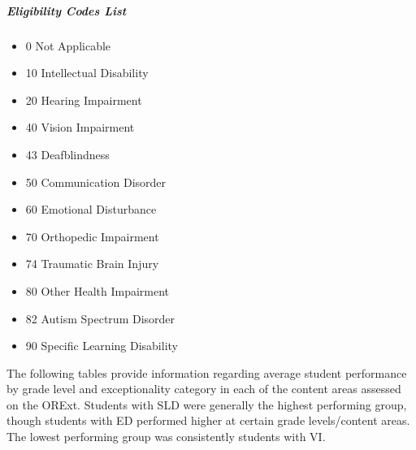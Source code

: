 \documentclass[]{article}
\providecommand{\tightlist}{%
  \setlength{\itemsep}{0pt}\setlength{\parskip}{0pt}}
\let\oldsubparagraph\subparagraph
\renewcommand{\subparagraph}[1]{\oldsubparagraph{#1}\mbox{}}
\begin{document}
\hypertarget{eligibility-codes-list}{%
\subparagraph{Eligibility Codes List}\label{eligibility-codes-list}}

\begin{itemize}
\tightlist
\item
  0 Not Applicable
\item
  10 Intellectual Disability
\item
  20 Hearing Impairment
\item
  40 Vision Impairment
\item
  43 Deafblindness
\item
  50 Communication Disorder
\item
  60 Emotional Disturbance
\item
  70 Orthopedic Impairment
\item
  74 Traumatic Brain Injury
\item
  80 Other Health Impairment
\item
  82 Autism Spectrum Disorder
\item
  90 Specific Learning Disability
\end{itemize}

The following tables provide information regarding average student
performance by grade level and exceptionality category in each of the
content areas assessed on the ORExt. Students with SLD were generally
the highest performing group, though students with ED performed higher
at certain grade levels/content areas. The lowest performing group was
consistently students with VI. \FloatBarrier
\end{document}
